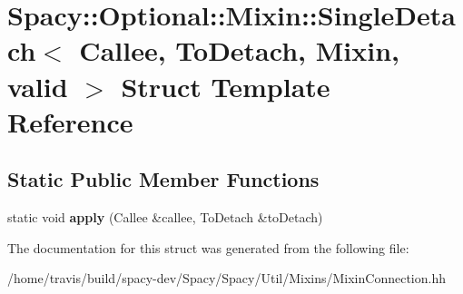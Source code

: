 \hypertarget{structSpacy_1_1Optional_1_1Mixin_1_1SingleDetach}{\section{Spacy\-:\-:Optional\-:\-:Mixin\-:\-:Single\-Detach$<$ Callee, To\-Detach, Mixin, valid $>$ Struct Template Reference}
\label{structSpacy_1_1Optional_1_1Mixin_1_1SingleDetach}
}
\subsection*{Static Public Member Functions}
\begin{DoxyCompactItemize}
\item 
\hypertarget{structSpacy_1_1Optional_1_1Mixin_1_1SingleDetach_a19a3ca88e4fd73c4c489104add58aba2}{static void {\bfseries apply} (Callee \&callee, To\-Detach \&to\-Detach)}\label{structSpacy_1_1Optional_1_1Mixin_1_1SingleDetach_a19a3ca88e4fd73c4c489104add58aba2}

\end{DoxyCompactItemize}


The documentation for this struct was generated from the following file\-:\begin{DoxyCompactItemize}
\item 
/home/travis/build/spacy-\/dev/\-Spacy/\-Spacy/\-Util/\-Mixins/Mixin\-Connection.\-hh\end{DoxyCompactItemize}
